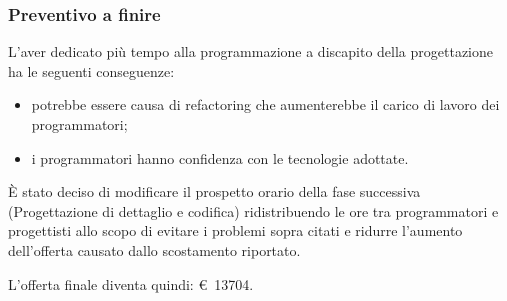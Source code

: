 \subsubsection{Preventivo a finire}
L'aver dedicato più tempo alla programmazione a discapito della progettazione ha le seguenti conseguenze:
\begin{itemize}
    \item potrebbe essere causa di refactoring che aumenterebbe il carico di lavoro dei programmatori;
    \item i programmatori hanno confidenza con le tecnologie adottate.
\end{itemize}
È stato deciso di modificare il prospetto orario della fase successiva (Progettazione di dettaglio e codifica) ridistribuendo le ore tra programmatori e progettisti allo scopo di evitare i problemi sopra citati e ridurre l'aumento dell'offerta causato dallo scostamento riportato.

\def\salarycontent{
    {Amministratore,22,20,440},
    {Analista,0,25,0},
    {Progettista,$80+\noexpand\textbf{10}$,22,1980},
    {Programmatore,$137-\noexpand\textbf{17}$,15,1800},
    {Responsabile,15,30,450},
    {Verificatore,82,15,1230},
    {Totale,329,127,$5935-\noexpand\textbf{35} = 5900 $ },
}


\noindent L'offerta finale diventa quindi: \euro\ 13704.

